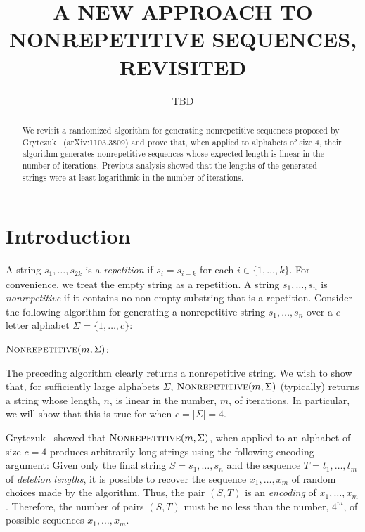 \documentclass{patmorin}
\title{\MakeUppercase{A New Approach to Nonrepetitive Sequences, Revisited}}
\author{TBD}
\begin{document}
\maketitle

\begin{abstract}
  We revisit a randomized algorithm for generating nonrepetitive sequences proposed by Grytczuk \etal\ (arXiv:1103.3809) and prove that, when applied to alphabets of size 4, their algorithm generates nonrepetitive sequences whose expected length is linear in the number of iterations. Previous analysis showed that the lengths of the generated strings were at least logarithmic in the number of iterations.
\end{abstract}

\section{Introduction}

A string $s_1,\ldots,s_{2k}$ is a \emph{repetition} if $s_i=s_{i+k}$ for each $i\in\{1,\ldots,k\}$.  For convenience, we treat the empty string as a repetition.  A string $s_1,\ldots,s_n$ is \emph{nonrepetitive} if it contains no non-empty substring that is a repetition.  Consider the following algorithm for generating a nonrepetitive string $s_1,\ldots,s_n$ over a $c$-letter alphabet $\Sigma=\{1,\ldots,c\}$:

\noindent$\textsc{Nonrepetitive}(m,\Sigma)$:
\begin{algorithmic}[1]
  \ENDFOR
\end{algorithmic}

The preceding algorithm clearly returns a nonrepetitive string.  We wish to show that, for sufficiently large alphabets $\Sigma$, $\textsc{Nonrepetitive}(m,\Sigma)$ (typically) returns a string whose length, $n$, is linear in the number, $m$, of iterations.  In particular, we will show that this is true for when $c=|\Sigma|=4$.

Grytczuk \etal\ showed that $\textsc{Nonrepetitive}(m,\Sigma)$, when applied to an alphabet of size $c=4$ produces arbitrarily long strings using the following encoding argument:  Given only the final string $S=s_1,\ldots,s_n$ and the sequence $T=t_1,\ldots,t_m$ of \emph{deletion lengths}, it is possible to recover the sequence $x_1,\ldots,x_m$ of random choices made by the algorithm.  Thus, the pair $(S,T)$ is an \emph{encoding} of $x_1,\ldots,x_m$. Therefore, the number of pairs $(S,T)$ must be no less than the number, $4^m$, of possible sequences $x_1,\ldots,x_m$.  
\end{document}
